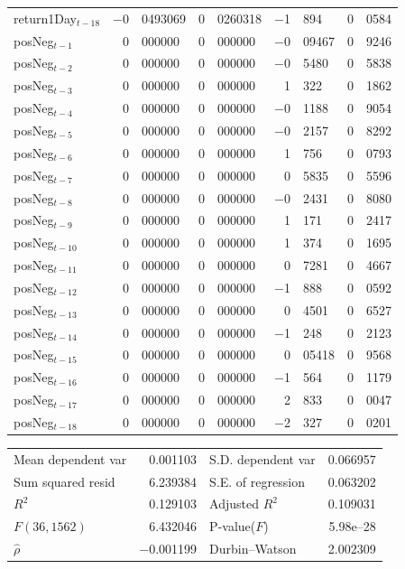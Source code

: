 \begin{center}
\begin{tabular}{lr@{.}lr@{.}lr@{.}lr@{.}l}
return1Day$_{t-18}$ &
    $-$0&0493069 &
    0&0260318 &
        $-$1&894 &
        0&0584 \\
posNeg$_{t-1}$ &
    0&000000 &
    0&000000 &
        $-$0&09467 &
        0&9246 \\
posNeg$_{t-2}$ &
    0&000000 &
    0&000000 &
        $-$0&5480 &
        0&5838 \\
posNeg$_{t-3}$ &
    0&000000 &
    0&000000 &
        1&322 &
        0&1862 \\
posNeg$_{t-4}$ &
    0&000000 &
    0&000000 &
        $-$0&1188 &
        0&9054 \\
posNeg$_{t-5}$ &
    0&000000 &
    0&000000 &
        $-$0&2157 &
        0&8292 \\
posNeg$_{t-6}$ &
    0&000000 &
    0&000000 &
        1&756 &
        0&0793 \\
posNeg$_{t-7}$ &
    0&000000 &
    0&000000 &
        0&5835 &
        0&5596 \\
posNeg$_{t-8}$ &
    0&000000 &
    0&000000 &
        $-$0&2431 &
        0&8080 \\
posNeg$_{t-9}$ &
    0&000000 &
    0&000000 &
        1&171 &
        0&2417 \\
posNeg$_{t-10}$ &
    0&000000 &
    0&000000 &
        1&374 &
        0&1695 \\
posNeg$_{t-11}$ &
    0&000000 &
    0&000000 &
        0&7281 &
        0&4667 \\
posNeg$_{t-12}$ &
    0&000000 &
    0&000000 &
        $-$1&888 &
        0&0592 \\
posNeg$_{t-13}$ &
    0&000000 &
    0&000000 &
        0&4501 &
        0&6527 \\
posNeg$_{t-14}$ &
    0&000000 &
    0&000000 &
        $-$1&248 &
        0&2123 \\
posNeg$_{t-15}$ &
    0&000000 &
    0&000000 &
        0&05418 &
        0&9568 \\
posNeg$_{t-16}$ &
    0&000000 &
    0&000000 &
        $-$1&564 &
        0&1179 \\
posNeg$_{t-17}$ &
    0&000000 &
    0&000000 &
        2&833 &
        0&0047 \\
posNeg$_{t-18}$ &
    0&000000 &
    0&000000 &
        $-$2&327 &
        0&0201 \\
\end{tabular}

\vspace{1ex}
\begin{tabular}{lrlr}
Mean dependent var &  0.001103 & S.D. dependent var &  0.066957 \\
Sum squared resid &  6.239384 & S.E. of regression &  0.063202 \\
$R^2$ &  0.129103 & Adjusted $R^2$ &  0.109031 \\
$F(36, 1562)$ &  6.432046 & P-value($F$) &  5.98\textrm{e--28} \\
$\hat{\rho}$ & $-$0.001199 & Durbin--Watson &  2.002309 \\
\end{tabular}


\end{center}

